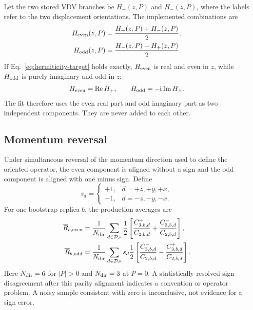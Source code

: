 \documentclass[11pt]{article}
\numberwithin{equation}{section}
\newcommand{\ii}{\mathrm{i}}
\begin{document}
Let the two stored VDV branches be $H_+(z,P)$ and $H_-(z,P)$, where the labels
refer to the two displacement orientations.  The implemented combinations are
\begin{align}
  H_{\rm even}(z,P)
  &=\frac{H_+(z,P)+H_-(z,P)}{2},
  \\
  H_{\rm odd}(z,P)
  &=\frac{H_-(z,P)-H_+(z,P)}{2}.
  \label{eq:vdv-even-odd}
\end{align}
If Eq.~\eqref{eq:hermiticity-target} holds exactly, $H_{\rm even}$ is real and
even in $z$, while $H_{\rm odd}$ is purely imaginary and odd in $z$:
\begin{equation}
  H_{\rm even}=\operatorname{Re}H_+,
  \qquad
  H_{\rm odd}=-\ii\operatorname{Im}H_+.
  \label{eq:even-real-odd-imag}
\end{equation}
The fit therefore uses the even real part and odd imaginary part as two
independent components.  They are never added to each other.

\subsection{Momentum reversal}

Under simultaneous reversal of the momentum direction used to define the
oriented operator, the even component is aligned without a sign and the odd
component is aligned with one minus sign.  Define
\begin{equation}
  s_d=\begin{cases}
  +1,&d=+z,+y,+x,\\
  -1,&d=-z,-y,-x.
  \end{cases}
  \label{eq:odd-direction-sign}
\end{equation}
For one bootstrap replica $b$, the production averages are
\begin{align}
  \overline R_{b,\rm even}
  &=\frac{1}{N_{\rm dir}}\sum_{d\in\mathcal D_P}
    \frac{1}{2}\left[
      \frac{C^+_{3,b,d}}{C_{2,b,d}}
     +\frac{C^-_{3,b,d}}{C_{2,b,d}}
    \right],
  \\
  \overline R_{b,\rm odd}
  &=\frac{1}{N_{\rm dir}}\sum_{d\in\mathcal D_P}s_d
    \frac{1}{2}\left[
      \frac{C^-_{3,b,d}}{C_{2,b,d}}
     -\frac{C^+_{3,b,d}}{C_{2,b,d}}
    \right].
  \label{eq:production-direction-average}
\end{align}
Here $N_{\rm dir}=6$ for $|P|>0$ and $N_{\rm dir}=3$ at $P=0$.  A statistically
resolved sign disagreement after this parity alignment indicates a convention
or operator problem.  A noisy sample consistent with zero is inconclusive,
not evidence for a sign error.
\end{document}
